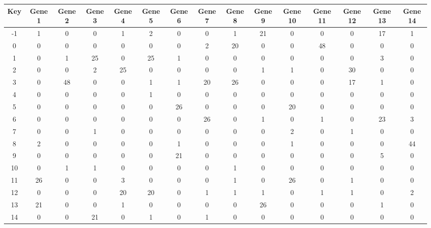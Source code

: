 \begin{tabular}{|c|c|c|c|c|c|c|c|c|c|c|c|c|c|c|}
\hline
Key & Gene 1 & Gene 2 & Gene 3 & Gene 4 & Gene 5 & Gene 6 & Gene 7 & Gene 8 & Gene 9 & Gene 10 & Gene 11 & Gene 12 & Gene 13 & Gene 14 \\
\hline
-1 & 1 & 0 & 0 & 1 & 2 & 0 & 0 & 1 & 21 & 0 & 0 & 0 & 17 & 1 \\
0 & 0 & 0 & 0 & 0 & 0 & 0 & 2 & 20 & 0 & 0 & 48 & 0 & 0 & 0 \\
1 & 0 & 1 & 25 & 0 & 25 & 1 & 0 & 0 & 0 & 0 & 0 & 0 & 3 & 0 \\
2 & 0 & 0 & 2 & 25 & 0 & 0 & 0 & 0 & 1 & 1 & 0 & 30 & 0 & 0 \\
3 & 0 & 48 & 0 & 0 & 1 & 1 & 20 & 26 & 0 & 0 & 0 & 17 & 1 & 0 \\
4 & 0 & 0 & 0 & 0 & 1 & 0 & 0 & 0 & 0 & 0 & 0 & 0 & 0 & 0 \\
5 & 0 & 0 & 0 & 0 & 0 & 26 & 0 & 0 & 0 & 20 & 0 & 0 & 0 & 0 \\
6 & 0 & 0 & 0 & 0 & 0 & 0 & 26 & 0 & 1 & 0 & 1 & 0 & 23 & 3 \\
7 & 0 & 0 & 1 & 0 & 0 & 0 & 0 & 0 & 0 & 2 & 0 & 1 & 0 & 0 \\
8 & 2 & 0 & 0 & 0 & 0 & 1 & 0 & 0 & 0 & 1 & 0 & 0 & 0 & 44 \\
9 & 0 & 0 & 0 & 0 & 0 & 21 & 0 & 0 & 0 & 0 & 0 & 0 & 5 & 0 \\
10 & 0 & 1 & 1 & 0 & 0 & 0 & 0 & 1 & 0 & 0 & 0 & 0 & 0 & 0 \\
11 & 26 & 0 & 0 & 3 & 0 & 0 & 0 & 1 & 0 & 26 & 0 & 1 & 0 & 0 \\
12 & 0 & 0 & 0 & 20 & 20 & 0 & 1 & 1 & 1 & 0 & 1 & 1 & 0 & 2 \\
13 & 21 & 0 & 0 & 1 & 0 & 0 & 0 & 0 & 26 & 0 & 0 & 0 & 1 & 0 \\
14 & 0 & 0 & 21 & 0 & 1 & 0 & 1 & 0 & 0 & 0 & 0 & 0 & 0 & 0 \\
\hline
\end{tabular}